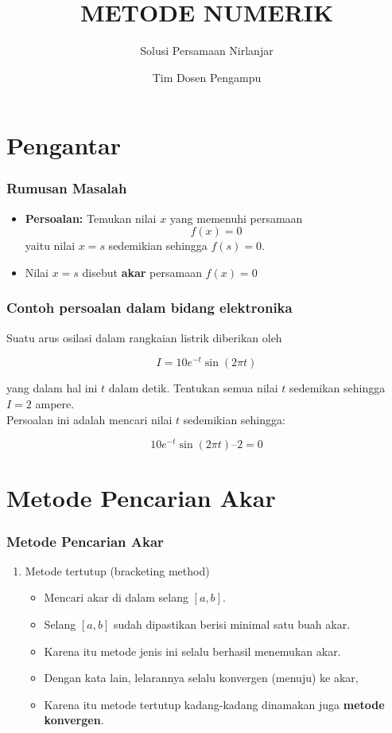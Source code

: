 \documentclass[pdflatex,compress]{beamer}
\title{METODE NUMERIK}
\subtitle{Solusi Persamaan Nirlanjar}
\author{Tim Dosen Pengampu}
\begin{document}
	
\maketitle

\section{Pengantar}

\begin{frame}
	\frametitle{Rumusan Masalah}
	\begin{itemize}
		\item \textbf{Persoalan:} Temukan nilai $ x $ yang memenuhi persamaan
		\[f(x) = 0\]
		yaitu nilai $ x = s $ sedemikian sehingga $ f(s) = 0 $.
		\item Nilai $ x = s $ disebut \textbf{akar} persamaan $ f(x) = 0 $
	\end{itemize}
\end{frame}

\begin{frame}
	\frametitle{Contoh persoalan dalam bidang elektronika}
	Suatu arus osilasi dalam rangkaian listrik diberikan oleh
	
	\[ I = 10e^{-t}\sin(2 \pi t) \]
	
	yang dalam hal ini $ t $ dalam detik. Tentukan semua nilai $ t $
	sedemikan sehingga $ I = 2 $ ampere.\\
	Persoalan ini adalah mencari nilai $ t $ sedemikian sehingga:

	\[ 10e^{-t} \sin(2 \pi t) – 2 = 0 \]
\end{frame}

\section{Metode Pencarian Akar}

\begin{frame}
	\frametitle{Metode Pencarian Akar}
	\begin{enumerate}
		\item Metode tertutup (bracketing method)
		\begin{itemize}
			\item Mencari akar di dalam selang $ [a, b] $.
			\item Selang $ [a, b] $ sudah dipastikan berisi minimal satu buah akar.
			\item Karena itu metode jenis ini selalu berhasil menemukan akar.
			\item Dengan kata lain, lelarannya selalu konvergen (menuju) ke akar,
			\item Karena itu metode tertutup kadang-kadang dinamakan juga \textbf{metode konvergen}.
		\end{itemize}
	\end{enumerate}
\end{frame}
\end{document}
